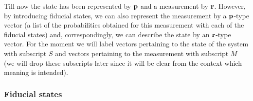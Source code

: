 \documentclass[12pt]{article}
\begin{document}
Till now the state has been represented by ${\bf p}$ and a measurement
by ${\bf r}$.  However, by introducing fiducial states, we
can also represent the measurement by a ${\bf
p}$-type vector (a list of the probabilities obtained for this
measurement with each of the fiducial states) and, correspondingly, we
can describe the state by an ${\bf r}$-type vector.
For the moment we will label vectors pertaining to the state of the
system with subscript $S$ and vectors pertaining to the measurement with
subscript $M$ (we will drop these subscripts later since it will be
clear from the context which meaning is intended).

\subsubsection{Fiducial states}
\end{document}
